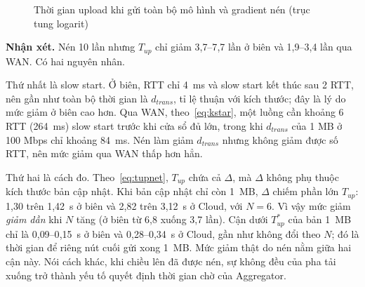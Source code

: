\begin{figure}[H]
    \centering
    \caption{Thời gian upload khi gửi toàn bộ mô hình và gradient nén (trục tung logarit)}
    \label{fig:q2}
\end{figure}

\textbf{Nhận xét.} Nén 10 lần nhưng $T_{up}$ chỉ giảm 3{,}7--7{,}7 lần ở biên và 1{,}9--3{,}4 lần qua WAN. Có hai nguyên nhân.

Thứ nhất là slow start. Ở biên, RTT chỉ 4~ms và slow start kết thúc sau 2 RTT, nên gần như toàn bộ thời gian là $d_{trans}$, tỉ lệ thuận với kích thước; đây là lý do mức giảm ở biên cao hơn. Qua WAN, theo~\eqref{eq:kstar}, một luồng cần khoảng 6 RTT (264~ms) slow start trước khi cửa sổ đủ lớn, trong khi $d_{trans}$ của 1 MB ở 100 Mbps chỉ khoảng 84~ms. Nén làm giảm $d_{trans}$ nhưng không giảm được số RTT, nên mức giảm qua WAN thấp hơn hẳn.

Thứ hai là cách đo. Theo~\eqref{eq:tupnet}, $T_{up}$ chứa cả $\Delta$, mà $\Delta$ không phụ thuộc kích thước bản cập nhật. Khi bản cập nhật chỉ còn 1~MB, $\Delta$ chiếm phần lớn $T_{up}$: 1{,}30 trên 1{,}42~s ở biên và 2{,}82 trên 3{,}12~s ở Cloud, với $N = 6$. Vì vậy mức giảm \emph{giảm dần} khi $N$ tăng (ở biên từ 6{,}8 xuống 3{,}7 lần). Cận dưới $T_{up}^{*}$ của bản 1~MB chỉ là 0{,}09--0{,}15~s ở biên và 0{,}28--0{,}34~s ở Cloud, gần như không đổi theo $N$; đó là thời gian để riêng nút cuối gửi xong 1~MB. Mức giảm thật do nén nằm giữa hai cận này. Nói cách khác, khi chiều lên đã được nén, sự không đều của pha tải xuống trở thành yếu tố quyết định thời gian chờ của Aggregator.


